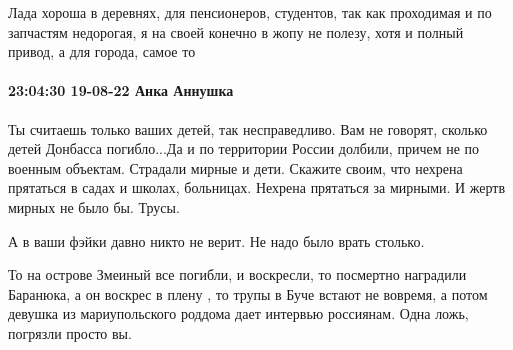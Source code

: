Лада хороша в деревнях, для пенсионеров, студентов, так как проходимая и по
запчастям недорогая, я на своей конечно в жопу не полезу, хотя и полный привод,
а для города, самое то

\paragraph{23:04:30 19-08-22 Анка Аннушка}

Ты считаешь только ваших детей, так несправедливо. Вам не говорят, сколько
детей Донбасса погибло...Да и по территории России долбили, причем не по
военным объектам. Страдали мирные и дети. Скажите своим, что нехрена прятаться
в садах и школах, больницах. Нехрена прятаться за мирными. И жертв мирных не
было бы. Трусы.

А в ваши фэйки давно никто не верит. Не надо было врать столько.

То на острове Змеиный все погибли, и воскресли, то посмертно наградили
Баранюка, а он воскрес в плену , то трупы в Буче встают не вовремя, а потом
девушка из мариупольского роддома дает интервью россиянам. Одна ложь, погрязли
просто вы.


